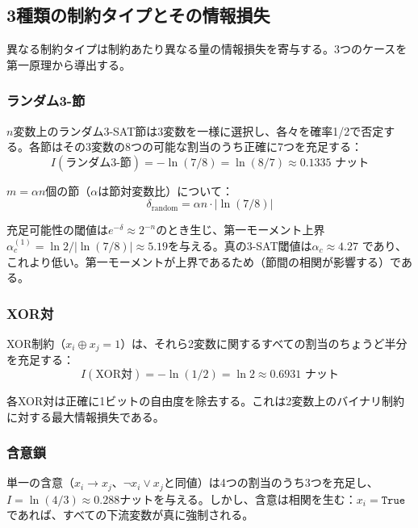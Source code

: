 \documentclass[11pt,a4paper]{article}
\begin{document}
\subsection{3種類の制約タイプとその情報損失}

異なる制約タイプは制約あたり異なる量の情報損失を寄与する。3つのケースを第一原理から導出する。

\subsubsection{ランダム3-節}

$n$変数上のランダム3-SAT節は3変数を一様に選択し、各々を確率1/2で否定する。各節はその3変数の8つの可能な割当のうち正確に7つを充足する：
\begin{equation}
I(\text{ランダム3-節}) = -\ln(7/8) = \ln(8/7) \approx 0.1335 \text{ ナット}
\label{eq:delta-random}
\end{equation}

$m = \alpha n$個の節（$\alpha$は節対変数比）について：
\begin{equation}
\delta_{\text{random}} = \alpha n \cdot |\ln(7/8)|
\label{eq:delta-random-total}
\end{equation}

充足可能性の閾値は$e^{-\delta} \approx 2^{-n}$のとき生じ、第一モーメント上界$\alpha_c^{(1)} = \ln 2 / |\ln(7/8)| \approx 5.19$を与える。真の3-SAT閾値は$\alpha_c \approx 4.27$ \cite{mezard2002,friedgut1999,achlioptas2009}であり、これより低い。第一モーメントが上界であるため（節間の相関が影響する）である。

\subsubsection{XOR対}

XOR制約（$x_i \oplus x_j = 1$）は、それら2変数に関するすべての割当のちょうど半分を充足する：
\begin{equation}
I(\text{XOR対}) = -\ln(1/2) = \ln 2 \approx 0.6931 \text{ ナット}
\label{eq:delta-xor}
\end{equation}

各XOR対は正確に1ビットの自由度を除去する。これは2変数上のバイナリ制約に対する最大情報損失である。

\subsubsection{含意鎖}

単一の含意（$x_i \to x_j$、$\neg x_i \lor x_j$と同値）は4つの割当のうち3つを充足し、$I = \ln(4/3) \approx 0.288$ナットを与える。しかし、含意は相関を生む：$x_i = \mathtt{True}$であれば、すべての下流変数が真に強制される。
\end{document}
